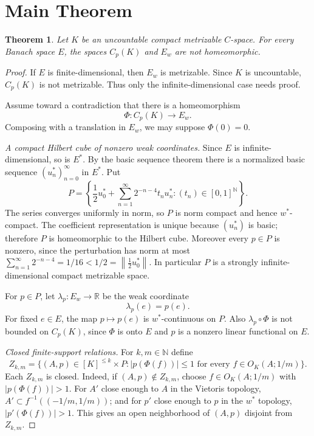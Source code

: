 \documentclass[11pt]{article}
\newtheorem{theorem}{Theorem}
\newcommand{\norm}[1]{\left\lVert #1 \right\rVert}
\newcommand{\weakstar}{w^*}
\begin{document}
\section*{Main Theorem}

\begin{theorem}\label{thm:main}
Let $K$ be an uncountable compact metrizable $C$-space. For every Banach
space $E$, the spaces $C_p(K)$ and $E_w$ are not homeomorphic.
\end{theorem}

\begin{proof}
If $E$ is finite-dimensional, then $E_w$ is metrizable. Since $K$ is
uncountable, $C_p(K)$ is not metrizable. Thus only the infinite-dimensional
case needs proof.

Assume toward a contradiction that there is a homeomorphism
\[
  \Phi:C_p(K)\longrightarrow E_w.
\]
Composing with a translation in $E_w$, we may suppose $\Phi(0)=0$.

\smallskip
\noindent\emph{A compact Hilbert cube of nonzero weak coordinates.}
Since $E$ is infinite-dimensional, so is $E^*$. By the basic sequence theorem
there is a normalized basic sequence $(u_n^*)_{n=0}^\infty$ in $E^*$. Put
\[
  P=\left\{\frac12 u_0^*+\sum_{n=1}^\infty 2^{-n-4}t_n u_n^*:
    (t_n)\in [0,1]^{\mathbb N}\right\}.
\]
The series converges uniformly in norm, so $P$ is norm compact and hence
$\weakstar$-compact. The coefficient representation is unique because
$(u_n^*)$ is basic; therefore $P$ is homeomorphic to the Hilbert cube.
Moreover every $p\in P$ is nonzero, since the perturbation has norm at most
$\sum_{n=1}^\infty 2^{-n-4}=1/16<1/2=\norm{\frac12 u_0^*}$.
In particular $P$ is a strongly infinite-dimensional compact metrizable
space.

For $p\in P$, let $\lambda_p:E_w\to\mathbb R$ be the weak coordinate
\[
  \lambda_p(e)=p(e).
\]
For fixed $e\in E$, the map $p\mapsto p(e)$ is $\weakstar$-continuous on
$P$. Also $\lambda_p\circ\Phi$ is not bounded on $C_p(K)$, since $\Phi$ is
onto $E$ and $p$ is a nonzero linear functional on $E$.

\smallskip
\noindent\emph{Closed finite-support relations.}
For $k,m\in\mathbb N$ define
\[
  Z_{k,m}=\{(A,p)\in [K]^{\le k}\times P:
  |p(\Phi(f))|\le 1\text{ for every }f\in O_K(A;1/m)\}.
\]
Each $Z_{k,m}$ is closed. Indeed, if $(A,p)\notin Z_{k,m}$, choose
$f\in O_K(A;1/m)$ with $|p(\Phi(f))|>1$. For $A'$ close enough to $A$ in
the Vietoris topology, $A'\subset f^{-1}((-1/m,1/m))$; and for $p'$ close
enough to $p$ in the $\weakstar$ topology, $|p'(\Phi(f))|>1$. This gives an
open neighborhood of $(A,p)$ disjoint from $Z_{k,m}$.


\end{proof}
\end{document}
